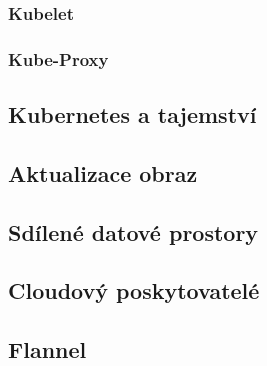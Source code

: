 \subsubsection{Kubelet}



\subsubsection{Kube-Proxy}



\subsection{Kubernetes a tajemství}



\subsection{Aktualizace obraz}



\subsection{Sdílené datové prostory}



\subsection{Cloudový poskytovatelé}



\subsection{Flannel}

